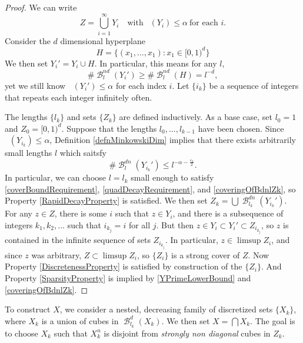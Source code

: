 \documentclass[dvipsnames,letterpaper,12pt]{article}
\numberwithin{equation}{section}
\theoremstyle{plain}
\theoremstyle{remark}
\DeclareMathOperator{\lowminkdim}{\underline{\dim}_{\mathbf{M}}}
\DeclareMathOperator{\B}{\mathcal{B}}
\begin{document}
\begin{proof}
	We can write
	\[ Z = \bigcup_{i = 1}^\infty Y_i \quad \text{with}\ \lowminkdim(Y_i) \leq \alpha\ \text{for each $i$}. \]
	Consider the $d$ dimensional hyperplane
	\[ H = \{ (x_1,\dots, x_1) \colon x_1 \in [0,1)^d \} \]
	We then set $Y_i' = Y_i \cup H$. In particular, this means for any $l$,
	\begin{equation}\label{YPrimeLowerBound}
		\# \B^{nd}_l(Y_i') \geq \# \B^{nd}_l(H) = l^{-d},
	\end{equation}
	yet we still know $\lowminkdim(Y_i') \leq \alpha$ for each index $i$. Let $\{ i_k \}$ be a sequence of integers that repeats each integer infinitely often.

	The lengths $\{ l_k \}$ and sets $\{ Z_k \}$ are defined inductively. As a base case, set $l_0 = 1$ and $Z_0 = [0,1)^d$. Suppose that the lengths $l_0, \ldots, l_{k-1}$ have been chosen. Since $\lowminkdim(Y_{i_k}) \leq \alpha$, Definition \ref{defnMinkowskiDim} implies that there exists arbitrarily small lengths $l$ which saitsfy
	\begin{equation}\label{coveringOfBdnlZk}
		\# \B^{dn}_l(Y_{i_k}') \leq l^{-\alpha - \frac{\varepsilon_k}{2}}.
	\end{equation}
	In particular, we can choose $l = l_k$ small enough to satisfy \eqref{coverBoundRequirement}, \eqref{quadDecayRequirement}, and \eqref{coveringOfBdnlZk}, so Property \ref{RapidDecayProperty} is satisfied. We then set $Z_k = \bigcup \B^{dn}_{l_k}(Y_{i_k}')$. For any $z \in Z$, there is some $i$ such that $z \in Y_i$, and there is a subsequence of integers $k_1, k_2, \dots$ such that $i_{k_j} = i$ for all $j$. But then $z \in Y_i \subset Y_i' \subset Z_{i_{k_j}}$, so $z$ is contained in the infinite sequence of sets $Z_{i_{k_j}}$. In particular, $z \in \limsup Z_i$, and since $z$ was arbitrary, $Z \subset \limsup Z_i$, so $\{ Z_i \}$ is a strong cover of $Z$. Now Property \ref{DiscretenessProperty} is satisfied by construction of the $\{ Z_i \}$. And Property \ref{SparsityProperty} is implied by \eqref{YPrimeLowerBound} and \eqref{coveringOfBdnlZk}.
\end{proof}

To construct $X$, we consider a nested, decreasing family of discretized sets $\{ X_k \}$, where $X_k$ is a union of cubes in $\B^d_{l_k}(X_k)$. We then set $X = \bigcap X_k$. The goal is to choose $X_k$ such that $X_k^n$ is disjoint from {\it strongly non diagonal} cubes in $Z_k$.
\end{document}
